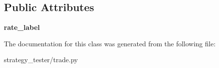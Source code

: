 \subsection*{\-Public \-Attributes}
\begin{DoxyCompactItemize}
\item 
\hypertarget{classstrategy__tester_1_1trade_1_1TradeCash_a4b2c03c552dfdd3f0381deb3eccfd2ce}{{\bfseries rate\-\_\-label}}\label{classstrategy__tester_1_1trade_1_1TradeCash_a4b2c03c552dfdd3f0381deb3eccfd2ce}

\end{DoxyCompactItemize}


\-The documentation for this class was generated from the following file\-:\begin{DoxyCompactItemize}
\item 
strategy\-\_\-tester/trade.\-py\end{DoxyCompactItemize}
